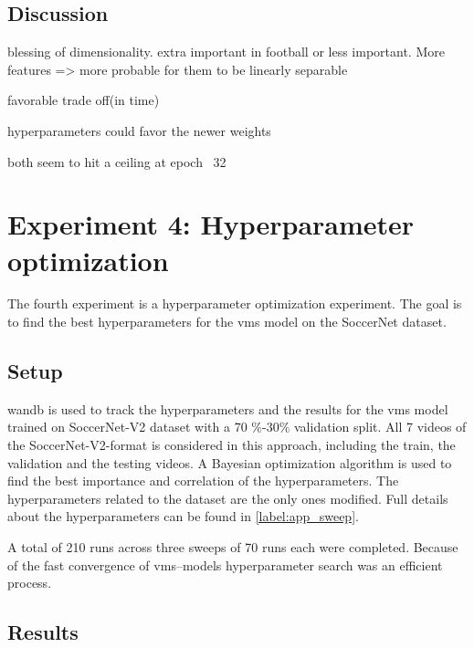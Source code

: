 \subsection{Discussion}
\label{ssec:ex3_discussion}

blessing of dimensionality. extra important in football or less important. More features => more probable for them to be linearly separable

favorable trade off(in time)

hyperparameters could favor the newer weights

both seem to hit a ceiling at epoch ~32


\section{Experiment 4: Hyperparameter optimization}
\label{sec:experiment4}

The fourth experiment is a hyperparameter optimization experiment.
The goal is to find the best hyperparameters for the \acrshort{vms} model on the SoccerNet dataset.

\subsection{Setup}
\label{ssec:ex4_setup}

\acrlong{wandb} is used to track the hyperparameters and the results for the \acrshort{vms} model trained on SoccerNet-V2 dataset with a 70 \(\%\)-30\(\%\) validation split. All 7 videos of the SoccerNet-V2-format is considered in this approach, including the train, the validation and the testing videos. A Bayesian optimization algorithm is used to find the best importance and correlation of the hyperparameters. The hyperparameters related to the dataset are the only ones modified. Full details about the hyperparameters can be found in \autoref{label:app_sweep}.

A total of 210 runs across three sweeps of 70 runs each were completed. Because of the fast convergence of \acrshort{vms}--models hyperparameter search was an efficient process. 


\subsection{Results}
\label{ssec:ex4_results}

